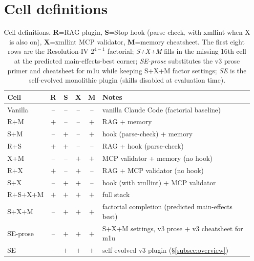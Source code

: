 \documentclass{article}
\begin{document}
\section{Cell definitions}
\label{app:cells}

\begin{table}[h]
  \caption{Cell definitions. \textbf{R}=RAG plugin, \textbf{S}=Stop-hook (parse-check, with xmllint when X is also on), \textbf{X}=xmllint MCP validator, \textbf{M}=memory cheatsheet. The first eight rows are the Resolution-IV $2^{4-1}$ factorial; \emph{S+X+M} fills in the missing 16th cell at the predicted main-effects-best corner; \emph{SE-prose} substitutes the v3 prose primer and cheatsheet for m1u while keeping S+X+M factor settings; \emph{SE} is the self-evolved monolithic plugin (skills disabled at evaluation time).}
  \label{tab:cells}
  \centering
  \small
  \begin{tabular}{lccccl}
    \toprule
    \textbf{Cell} & \textbf{R} & \textbf{S} & \textbf{X} & \textbf{M} & \textbf{Notes} \\
    \midrule
    Vanilla & --  & --  & --  & --  & vanilla Claude Code (factorial baseline)               \\
    R+M & $+$ & --  & --  & $+$ & RAG + memory                                           \\
    S+M & --  & $+$ & --  & $+$ & hook (parse-check) + memory                            \\
    R+S & $+$ & $+$ & --  & --  & RAG + hook (parse-check)                               \\
    X+M & --  & --  & $+$ & $+$ & MCP validator + memory (no hook)                       \\
    R+X & $+$ & --  & $+$ & --  & RAG + MCP validator (no hook)                          \\
    S+X & --  & $+$ & $+$ & --  & hook (with xmllint) + MCP validator                    \\
    R+S+X+M & $+$ & $+$ & $+$ & $+$ & full stack                                         \\
    \midrule
    S+X+M    & --  & $+$ & $+$ & $+$ & factorial completion (predicted main-effects best) \\
    SE-prose & --  & $+$ & $+$ & $+$ & S+X+M settings, v3 prose + v3 cheatsheet for m1u   \\
    SE       & --  & $+$ & $+$ & $+$ & self-evolved v3 plugin (\S\ref{subsec:overview})  \\
    \bottomrule
  \end{tabular}
\end{table}
\end{document}
